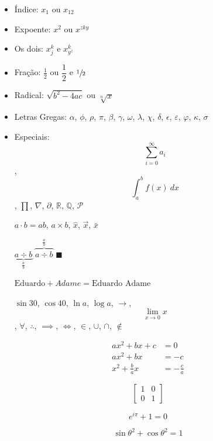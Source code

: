 \documentclass{article}
\begin{document}
\begin{itemize}
    \item Índice: $x_1$ ou $x_{12}$
    \item Expoente: $x^2$ ou $x^{zky}$
    \item Os dois: $x_j^k$ e $x_{y^z}^k$
    \item Fração: $\frac{1}{2}$ ou $\dfrac{1}{2}$ e $\sfrac{1}{2}$
    \item Radical: $\sqrt{b^2-4ac}$ ou $\sqrt[n]{x}$
    \item Letras Gregas: $\alpha$, $\phi$, $\rho$, $\pi$, $\beta$, $\gamma$, $\omega$, $\lambda$, $\chi$, $\delta$, $\epsilon$, $\varepsilon$, $\varphi$, $\kappa$, $\sigma$
    \item Especiais: $$\sum_{i=0}^{\infty} a_i$$, $$\int_{a}^{b} f(x)\ dx$$, $\prod$, $\nabla$, $\partial$, $\mathbb{R}$, $\mathbb{Q}$, $\mathcal{P}$
    
    $a \cdot b = ab$, $a \times b$, $\hat{x}$, $\vec{x}$, $\bar{x}$
    
    $\underbrace{a \div b}_{\frac{a}{b}}$
    $\overbrace{a \div b}^{\frac{a}{b}}$ $\blacksquare$
        
    $\text{Eduardo} + Adame = \text{Eduardo Adame}$ 
    
    $\sin{30}$, $\cos{40}$, $\ln{a}$, $\log{a}$, $\to$, $$\lim_{x \to 0} x$$, $\forall$, $\therefore$, $\implies$, $\iff$, $\in$, $\cup$, $\cap$, $\not\in$
    
\end{itemize}

    \begin{align*}
        ax^2 + bx + c &= 0\\
        ax^2 + bx &= -c\\
        x^2 + \frac{b}{a}x &= -\frac{c}{a}
    \end{align*}
    
    $$
    \begin{bmatrix}
    1 & 0\\
    0 & 1
    \end{bmatrix}
    $$
    
    
    \begin{equation}
        e^{i\pi} + 1 = 0
        \label{eq:eul}
    \end{equation}
    
    \begin{equation}
        \sin{\theta}^2 + \cos{\theta}^2 = 1
        \label{eq:id}
    \end{equation}
    
\end{document}
